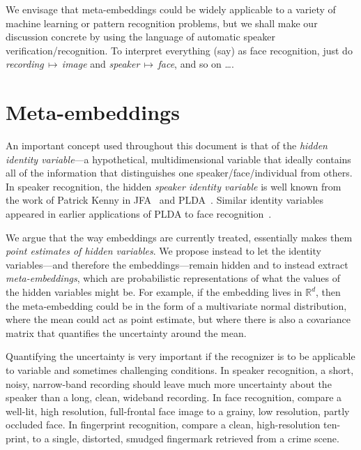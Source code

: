 \documentclass[a4paper,oneside,12pt,english]{report}
\def\R{\mathbb{R}}
\begin{document}
We envisage that meta-embeddings could be widely applicable to a variety of machine learning or pattern recognition problems, but we shall make our discussion concrete by using the language of automatic speaker verification/recognition. To interpret everything (say) as face recognition, just do \emph{recording}$\,\mapsto\,$\emph{image} and \emph{speaker}$\,\mapsto\,$\emph{face}, and so on \ldots.

\section{Meta-embeddings}
An important concept used throughout this document is that of the \emph{hidden identity variable}---a hypothetical, multidimensional variable that ideally contains all of the information that distinguishes one speaker/face/individual from others. In speaker recognition, the hidden \emph{speaker identity variable} is well known from the work of Patrick Kenny in JFA~\cite{JFA} and PLDA~\cite{HTPLDA}. Similar identity variables appeared in earlier applications of PLDA to face recognition~\cite{PLDA-IOFFE, PLDA-Prince, PLDA-Li}.

We argue that the way embeddings are currently treated, essentially makes them \emph{point estimates of hidden variables}. We propose instead to let the identity variables---and therefore the embeddings---remain hidden and to instead extract \emph{meta-embeddings}, which are probabilistic representations of what the values of the hidden variables might be. For example, if the embedding lives in $\R^d$, then the meta-embedding could be in the form of a multivariate normal distribution, where the mean could act as point estimate, but where there is also a covariance matrix that quantifies the uncertainty around the mean. 

Quantifying the uncertainty is very important if the recognizer is to be applicable to variable and sometimes challenging conditions. In speaker recognition, a short, noisy, narrow-band recording should leave much more uncertainty about the speaker than a long, clean, wideband recording. In face recognition, compare a well-lit, high resolution, full-frontal face image to a grainy, low resolution, partly occluded face. In fingerprint recognition, compare a clean, high-resolution ten-print, to a single, distorted, smudged fingermark retrieved from a crime scene.    
\end{document}
